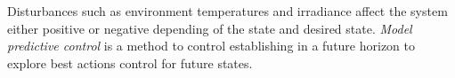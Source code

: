       Disturbances such as environment temperatures and irradiance affect 
      the system either positive or negative depending of the state and desired state. 
      \emph{Model predictive control} is a method to control establishing in a future 
      horizon to explore best actions control for future states.      
